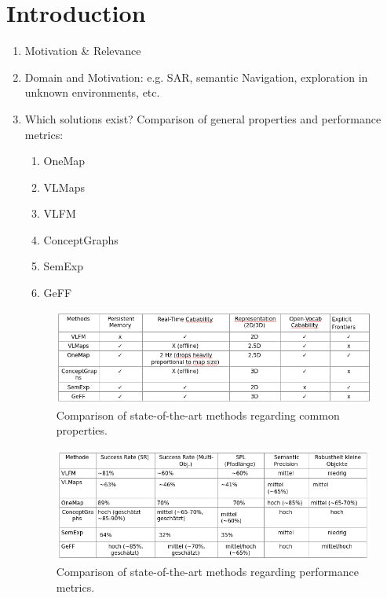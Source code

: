 \chapter{Introduction}

\begin{enumerate}
    \item Motivation \& Relevance
    \item Domain and Motivation: e.g. \ac{SAR}, semantic Navigation, exploration in unknown environments, etc.
    \item Which solutions exist? Comparison of general properties and performance metrics:
    \begin{enumerate}
        \item \ac{OneMap} \cite{busch2025onemap}
        \item \ac{VLMaps} \cite{huang23vlmaps}
        \item \ac{VLFM} \cite{yokoyama2024vlfm}
        \item \ac{ConceptGraphs} \cite{gu2023conceptgraphsopenvocabulary3dscene}
        \item \ac{SemExp} \cite{chaplot2020semexp}
        \item \ac{GeFF} \cite{qui2024geff}
    \end{enumerate}

    \begin{figure}[h!]
    \centering
    \includegraphics[width=\textwidth]{Images/1_introduction/temp_sota_comparison_common_properties.png}
    \caption{Comparison of state-of-the-art methods regarding common properties.}
    \label{fig:sota_comparison}
    \end{figure}

    \begin{figure}[h!]
    \centering
    \includegraphics[width=\textwidth]{Images/1_introduction/temp_sota_comparison_performance_metrics.png}
    \caption{Comparison of state-of-the-art methods regarding performance metrics.}
    \label{fig:sota_performance}
    \end{figure}


\end{enumerate}
